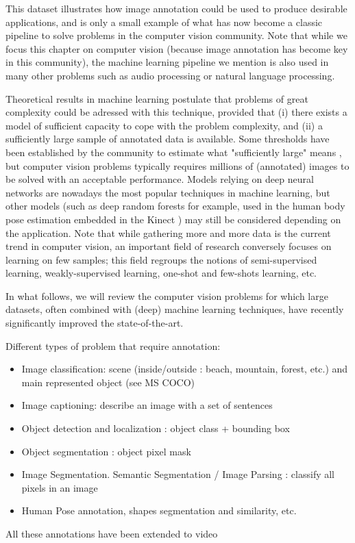 This dataset illustrates how image annotation could be used to produce desirable applications, and is only a small example of what has now become a classic pipeline to solve problems in the computer vision community. Note that while we focus this chapter on computer vision (because image annotation has become key in this community), the machine learning pipeline we mention is also used in many other problems such as audio processing or natural language processing. 

Theoretical results in machine learning postulate that problems of great complexity could be adressed with this technique, provided that (i) there exists a model of sufficient capacity to cope with the problem complexity, and (ii) a sufficiently large sample of annotated data is available. Some thresholds have been established by the community to estimate what "sufficiently large" means \cite{blabla}, but computer vision problems typically requires millions of (annotated) images to be solved with an acceptable performance. Models relying on deep neural networks are nowadays the most popular techniques in machine learning, but other models (such as deep random forests for example, used in the human body pose estimation embedded in the Kinect \cite{blabla}) may still be considered depending on the application. Note that while gathering more and more data is the current trend in computer vision, an important field of research conversely focuses on learning on few samples; this field regroups the notions of semi-supervised learning, weakly-supervised learning, one-shot and few-shots learning, etc. 

In what follows, we will review the computer vision problems for which large datasets, often combined with (deep) machine learning techniques, have recently significantly improved the state-of-the-art. 





Different types of problem that require annotation:
\begin{itemize}
	\item Image classification: scene (inside/outside : beach, mountain, forest, etc.) and main represented object (see MS COCO)
	\item Image captioning: describe an image with a set of sentences
	\item Object detection and localization : object class + bounding box
	\item Object segmentation : object pixel mask
	\item Image Segmentation. Semantic Segmentation / Image Parsing : classify all pixels in an image
	\item Human Pose annotation, shapes segmentation and similarity, etc.
\end{itemize}
All these annotations have been extended to video \\ \\


